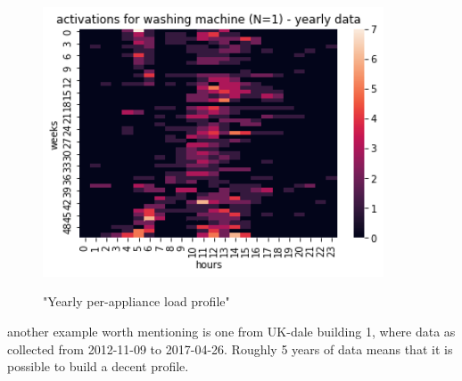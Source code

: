 \begin{figure}[H]
	\centering
	\caption{"Yearly per-appliance load profile"}
	\includegraphics[width=0.9\textwidth]{../Figures/LPS/HM_Ywh_wm.png}
	\label{fig:HM_Ywh_wm}
\end{figure}

another example worth mentioning is one from UK-dale building 1, where data as collected from 2012-11-09 to 2017-04-26.
Roughly 5 years of data means that it is possible to build a decent profile. 

